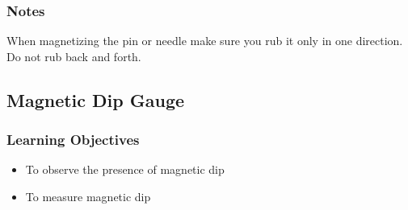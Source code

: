 \subsubsection*{Notes}
When magnetizing the pin or needle make sure you rub it only in one direction. Do not rub back and forth.




\subsection{Magnetic Dip Gauge}

\subsubsection*{Learning Objectives}
\begin{itemize}
\item{To observe the presence of magnetic dip}
\item{To measure magnetic dip}
\end{itemize}

